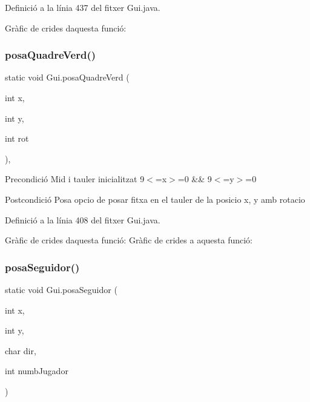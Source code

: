 Definició a la línia 437 del fitxer Gui.\+java.

Gràfic de crides d\textquotesingle{}aquesta funció\+:
\mbox{\label{class_gui_ac731f68776f8bdaf1637d5a448be4b48}} 
\subsubsection{\texorpdfstring{posa\+Quadre\+Verd()}{posaQuadreVerd()}}
{\footnotesize\ttfamily static void Gui.\+posa\+Quadre\+Verd (\begin{DoxyParamCaption}\item[{int}]{x,  }\item[{int}]{y,  }\item[{int}]{rot }\end{DoxyParamCaption})\hspace{0.3cm}{\ttfamily [static]}, {\ttfamily [private]}}

\begin{DoxyPrecond}{Precondició}
Mid i tauler inicialitzat 9$<$=x$>$=0 \&\& 9$<$=y$>$=0 
\end{DoxyPrecond}
\begin{DoxyPostcond}{Postcondició}
Posa opcio de posar fitxa en el tauler de la posicio x, y amb rotacio 
\end{DoxyPostcond}


Definició a la línia 408 del fitxer Gui.\+java.

Gràfic de crides d\textquotesingle{}aquesta funció\+:
Gràfic de crides a aquesta funció\+:
\mbox{\label{class_gui_abc7c9d2b0581636190ecc53bfc4b29fb}} 
\subsubsection{\texorpdfstring{posa\+Seguidor()}{posaSeguidor()}}
{\footnotesize\ttfamily static void Gui.\+posa\+Seguidor (\begin{DoxyParamCaption}\item[{int}]{x,  }\item[{int}]{y,  }\item[{char}]{dir,  }\item[{int}]{numb\+Jugador }\end{DoxyParamCaption})\hspace{0.3cm}{\ttfamily [static]}}

